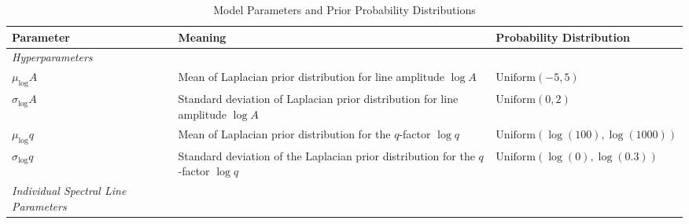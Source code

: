\documentclass[12pt]{emulateapj}
\begin{document}
\begin{table*}[hbtp]
\renewcommand{\arraystretch}{1.3}
\footnotesize
\caption{Model Parameters and Prior Probability Distributions}
\begin{threeparttable} 
\begin{tabularx}{\textwidth}{p{4.0cm}p{7.0cm}X}%
\toprule
\bf{Parameter} & \bf{Meaning} & \bf{Probability Distribution} \\ \midrule
\it{Hyperparameters} && \\ \midrule
$\mu_\log{A}$ & Mean of Laplacian prior distribution for line amplitude $\log{A}$ &  $\mathrm{Uniform}(-5, 5)$  \\
$\sigma_\log{A}$ & Standard deviation of Laplacian prior distribution for line amplitude $\log{A}$ & $\mathrm{Uniform}(0,2)$ \\
$\mu_\log{q}$ & Mean of Laplacian prior distribution for the $q$-factor $\log{q}$ & $\mathrm{Uniform}(\log(100), \log(1000))$  \\
$\sigma_\log{q}$ & Standard deviation of the Laplacian prior distribution for the $q$-factor $\log{q}$ & $\mathrm{Uniform}(\log(0), \log(0.3))$\\ 
\midrule
\it{Individual Spectral Line Parameters} && \\ \midrule


\end{tabularx}
\end{threeparttable}
\end{table*}
\end{document}
